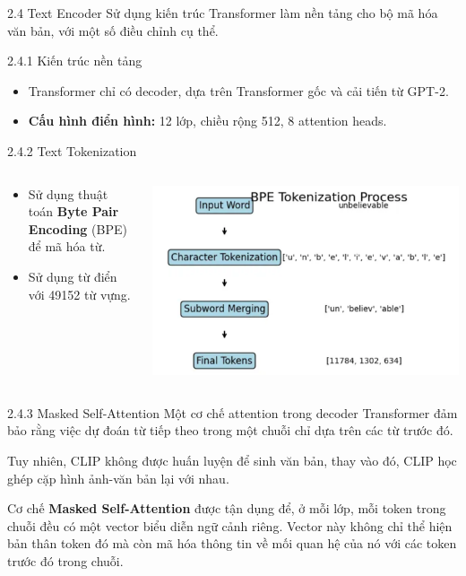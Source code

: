 \begin{frame}{2.4 Text Encoder}
    Sử dụng kiến trúc Transformer làm nền tảng cho bộ mã hóa văn bản, với một số điều chỉnh cụ thể.
\end{frame}

\begin{frame}{2.4.1 Kiến trúc nền tảng}
    \begin{itemize}
        \item Transformer chỉ có decoder, dựa trên Transformer gốc và cải tiến từ GPT-2.
        \item \textbf{Cấu hình điển hình:} 12 lớp, chiều rộng 512, 8 attention heads.
    \end{itemize}
\end{frame}

\begin{frame}{2.4.2 Text Tokenization}
\begin{columns}[c]
    \begin{column}{0.5\textwidth}
    \begin{itemize}
        \item Sử dụng thuật toán \textbf{Byte Pair Encoding} (BPE) để mã hóa từ.
        \item Sử dụng từ điển với 49152 từ vựng.
    \end{itemize}
    \end{column}

    \begin{column}{0.5\textwidth}
            \centering
            \includegraphics[width=\linewidth]{img/01-bpe.png}
    \end{column}
\end{columns}
\end{frame}

\begin{frame}{2.4.3 Masked Self-Attention}
Một cơ chế attention trong decoder Transformer đảm bảo rằng việc dự đoán
từ tiếp theo trong một chuỗi chỉ dựa trên các từ trước đó.

\bigskip
Tuy nhiên, CLIP không được huấn luyện để sinh văn bản, thay vào đó, CLIP học ghép cặp hình ảnh-văn bản lại với nhau. 

\bigskip
Cơ chế \textbf{Masked Self-Attention} được tận dụng để, ở mỗi lớp, mỗi token trong chuỗi đều có một vector biểu diễn ngữ cảnh riêng. Vector này không chỉ thể hiện bản thân token đó mà còn mã hóa thông tin về mối quan hệ của nó với các token trước đó trong chuỗi.
\end{frame}

